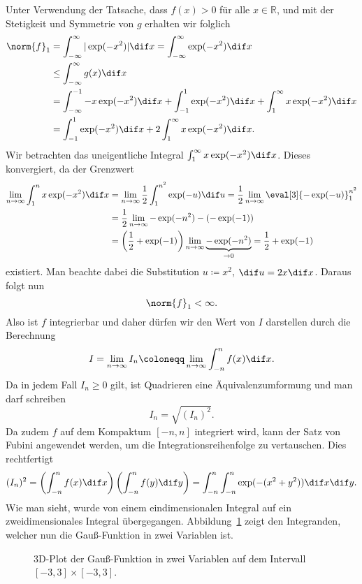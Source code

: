 \documentclass{scrartcl}
\newcommand{\R}{\mathbb{R}}
\begin{document}
Unter Verwendung der Tatsache, dass $ f(x) > 0 $ für alle $ x \in \R $, und mit der Stetigkeit und 
Symmetrie von $ g $ erhalten wir folglich
\begin{align*}
   \norm{f}_{1} 
&= \int_{-\infty}^{\infty} |\exp(-x^{2})| \dif x
 = \int_{-\infty}^{\infty} \exp(-x^{2}) \dif x \\
&\leq \int_{-\infty}^{\infty} g(x) \dif x \\
&= \int_{-\infty}^{-1} -x \exp(-x^{2}) \dif x 
   + \int_{-1}^{1} \exp(-x^{2}) \dif x
   + \int_{1}^{\infty} x \exp(-x^{2}) \dif x \\
&= \int_{-1}^{1} \exp(-x^{2}) \dif x + 2 \int_{1}^{\infty} x \exp(-x^{2}) \dif x.
\end{align*}
Wir betrachten das uneigentliche Integral $ \int_{1}^{\infty} x \exp(-x^{2}) \dif x $.
Dieses konvergiert, da der Grenzwert
\begin{align*}
   \lim\limits_{n \to \infty} \int_{1}^{n} x \exp(-x^{2}) \dif x
&= \lim\limits_{n \to \infty} \frac{1}{2} \int_{1}^{n^{2}} \exp(-u) \dif u
 = \frac{1}{2} \lim\limits_{n \to \infty} \eval[3]{-\exp(-u)}_{1}^{n^{2}} \\
&= \frac{1}{2} \lim\limits_{n \to \infty} - \exp(-n^{2}) - (-\exp(-1)) \\
&= \left( \frac{1}{2} + \exp(-1) \right) 
      \lim\limits_{n \to \infty} \underbrace{-\exp(-n^{2})}_{\to 0}
 = \frac{1}{2} + \exp(-1)
\end{align*}
existiert. Man beachte dabei die Substitution $ u \coloneqq x^{2} $, $ \dif u = 2x \dif x $. Daraus
folgt nun
\[
  \norm{f}_{1} < \infty.
\]
Also ist $ f $ integrierbar und daher dürfen wir den Wert von $ I $ darstellen durch die Berechnung
\[
  I = \lim\limits_{n \to \infty} I_{n} \coloneqq 
  \lim\limits_{n \to \infty} \int_{-n}^{n} f(x) \dif x.
\]
Da in jedem Fall $ I_{n} \geq 0 $ gilt, ist Quadrieren eine Äquivalenzumformung und man darf 
schreiben
\[
  I_{n} = \sqrt{ (I_{n})^{2} }.
\]
Da zudem $ f $ auf dem Kompaktum $ [-n, n] $ integriert wird, kann der Satz von Fubini angewendet
werden, um die Integrationsreihenfolge zu vertauschen. Dies rechtfertigt
\[
  (I_{n})^{2}
= \left( \int_{-n}^{n} f(x) \dif x \right) \left( \int_{-n}^{n} f(y) \dif y \right)
= \int_{-n}^{n} \int_{-n}^{n} \exp(-(x^{2} + y^{2})) \dif x \dif y.
\]
Wie man sieht, wurde von einem eindimensionalen Integral auf ein zweidimensionales Integral 
übergegangen. Abbildung~\ref{fig:gaussian3d} zeigt den Integranden, welcher nun die Gauß-Funktion
in zwei Variablen ist.
\begin{figure}[ht]
\centering
{}
\caption{3D-Plot der Gauß-Funktion in zwei Variablen auf dem Intervall $ [-3,3] \times [-3,3] $.}
\label{fig:gaussian3d}
\end{figure}
\end{document}
